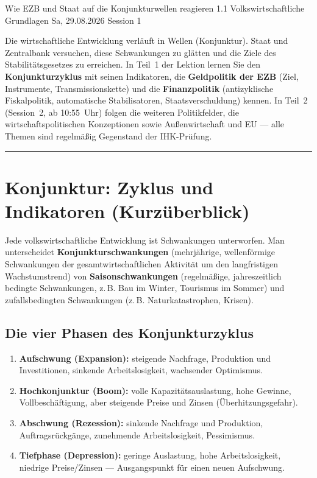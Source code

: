 \documentclass[11pt, a4paper]{article}
\begin{document}
%
  {Wie EZB und Staat auf die Konjunkturwellen reagieren}%
  {1.1 Volkswirtschaftliche Grundlagen}%
  {Sa, 29.08.2026 \textperiodcentered{} Session 1}

\begin{merksatz}[title={\bfseries Worum geht es in diesem Teil?}]
Die wirtschaftliche Entwicklung verläuft in Wellen (Konjunktur). Staat und Zentralbank
versuchen, diese Schwankungen zu glätten und die Ziele des Stabilitätsgesetzes zu erreichen.
In Teil~1 der Lektion lernen Sie den \textbf{Konjunkturzyklus} mit seinen Indikatoren, die
\textbf{Geldpolitik der EZB} (Ziel, Instrumente, Transmissionskette) und die
\textbf{Finanzpolitik} (antizyklische Fiskalpolitik, automatische Stabilisatoren,
Staatsverschuldung) kennen. In Teil~2 (Session~2, ab 10:55~Uhr) folgen die weiteren
Politikfelder, die wirtschaftspolitischen Konzeptionen sowie Außenwirtschaft und EU ---
alle Themen sind regelmäßig Gegenstand der IHK-Prüfung.
\end{merksatz}

\tableofcontents
\vspace{1em}
\hrule
\vspace{1em}

\section{Konjunktur: Zyklus und Indikatoren (Kurzüberblick)}

Jede volkswirtschaftliche Entwicklung ist Schwankungen unterworfen. Man unterscheidet
\textbf{Konjunkturschwankungen} (mehrjährige, wellenförmige Schwankungen der
gesamtwirtschaftlichen Aktivität um den langfristigen Wachstumstrend) von
\textbf{Saisonschwankungen} (regelmäßige, jahreszeitlich bedingte Schwankungen, z.\,B.
Bau im Winter, Tourismus im Sommer) und zufallsbedingten Schwankungen (z.\,B.
Naturkatastrophen, Krisen).

\subsection{Die vier Phasen des Konjunkturzyklus}

\begin{enumerate}
  \item \textbf{Aufschwung (Expansion):} steigende Nachfrage, Produktion und
    Investitionen, sinkende Arbeitslosigkeit, wachsender Optimismus.
  \item \textbf{Hochkonjunktur (Boom):} volle Kapazitätsauslastung, hohe Gewinne,
    Vollbeschäftigung, aber steigende Preise und Zinsen (Überhitzungsgefahr).
  \item \textbf{Abschwung (Rezession):} sinkende Nachfrage und Produktion,
    Auftragsrückgänge, zunehmende Arbeitslosigkeit, Pessimismus.
  \item \textbf{Tiefphase (Depression):} geringe Auslastung, hohe Arbeitslosigkeit,
    niedrige Preise/Zinsen --- Ausgangspunkt für einen neuen Aufschwung.
\end{enumerate}
\end{document}
